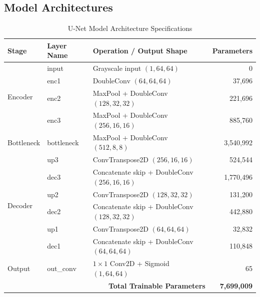 \documentclass[a4paper,10pt]{article}
\begin{document}
\subsection{Model Architectures}
\label{sec:model_arch}

\begin{table}[H]
\centering
\caption{U-Net Model Architecture Specifications}
\begin{tabular}{lllr}
\toprule
\textbf{Stage} & \textbf{Layer Name} & \textbf{Operation / Output Shape} & \textbf{Parameters} \\
\midrule
\multirow{4}{*}{Encoder}
& input & Grayscale input $(1,64,64)$ & 0 \\
& enc1 & DoubleConv $(64,64,64)$ & 37,696 \\
& enc2 & MaxPool + DoubleConv $(128,32,32)$ & 221,696 \\
& enc3 & MaxPool + DoubleConv $(256,16,16)$ & 885,760 \\
\midrule
Bottleneck
& bottleneck & MaxPool + DoubleConv $(512,8,8)$ & 3,540,992 \\
\midrule
\multirow{6}{*}{Decoder}
& up3 & ConvTranspose2D $(256,16,16)$ & 524,544 \\
& dec3 & Concatenate skip + DoubleConv $(256,16,16)$ & 1,770,496 \\
& up2 & ConvTranspose2D $(128,32,32)$ & 131,200 \\
& dec2 & Concatenate skip + DoubleConv $(128,32,32)$ & 442,880 \\
& up1 & ConvTranspose2D $(64,64,64)$ & 32,832 \\
& dec1 & Concatenate skip + DoubleConv $(64,64,64)$ & 110,848 \\
\midrule
Output
& out\_conv & $1\times1$ Conv2D + Sigmoid $(1,64,64)$ & 65 \\
\midrule
\multicolumn{3}{r}{\textbf{Total Trainable Parameters}} & \textbf{7,699,009} \\
\bottomrule
\end{tabular}
\end{table}
\end{document}
